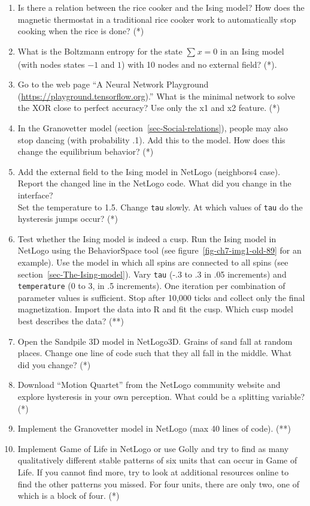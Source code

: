 \documentclass[
  a4paper,
  DIV=11,
  numbers=noendperiod,
  oneside]{scrreprt}
\begin{document}
\begin{enumerate}
\def\labelenumi{\arabic{enumi})}
\item
  Is there a relation between the rice cooker and the Ising model? How
  does the magnetic thermostat in a traditional rice cooker work to
  automatically stop cooking when the rice is done? (*)
\item
  What is the Boltzmann entropy for the state \(\sum_{}^{}x = 0\) in an
  Ising model (with nodes states \(-1\) and \(1\)) with 10 nodes and no
  external field? (*).
\item
  Go to the web page ``A Neural Network Playground
  (\url{https://playground.tensorflow.org}).'' What is the minimal
  network to solve the XOR close to perfect accuracy? Use only the x1
  and x2 feature. (*)
\item
  In the Granovetter model (section~\ref{sec-Social-relations}), people
  may also stop dancing (with probability .1). Add this to the model.
  How does this change the equilibrium behavior? (*)
\item
  Add the external field to the Ising model in NetLogo (neighbors4
  case). Report the changed line in the NetLogo code. What did you
  change in the interface?\\
  Set the temperature to 1.5. Change \texttt{tau} slowly. At which
  values of \texttt{tau} do the hysteresis jumps occur? (*)
\item
  Test whether the Ising model is indeed a cusp. Run the Ising model in
  NetLogo using the BehaviorSpace tool (see
  figure~\ref{fig-ch7-img1-old-89} for an example). Use the model in
  which all spins are connected to all spins (see
  section~\ref{sec-The-Ising-model}). Vary \texttt{tau} (-.3 to .3 in
  .05 increments) and \texttt{temperature} (0 to 3, in .5 increments).
  One iteration per combination of parameter values is sufficient. Stop
  after 10,000 ticks and collect only the final magnetization. Import
  the data into R and fit the cusp. Which cusp model best describes the
  data? (**)
\item
  Open the Sandpile 3D model in NetLogo3D. Grains of sand fall at random
  places. Change one line of code such that they all fall in the middle.
  What did you change? (*)
\item
  Download ``Motion Quartet'' from the NetLogo community website and
  explore hysteresis in your own perception. What could be a splitting
  variable? (*)
\item
  Implement the Granovetter model in NetLogo (max 40 lines of code).
  (**)
\item
  Implement Game of Life in NetLogo or use Golly and try to find as many
  qualitatively different stable patterns of six units that can occur in
  Game of Life. If you cannot find more, try to look at additional
  resources online to find the other patterns you missed. For four
  units, there are only two, one of which is a block of four. (*)
\end{enumerate}
\end{document}
